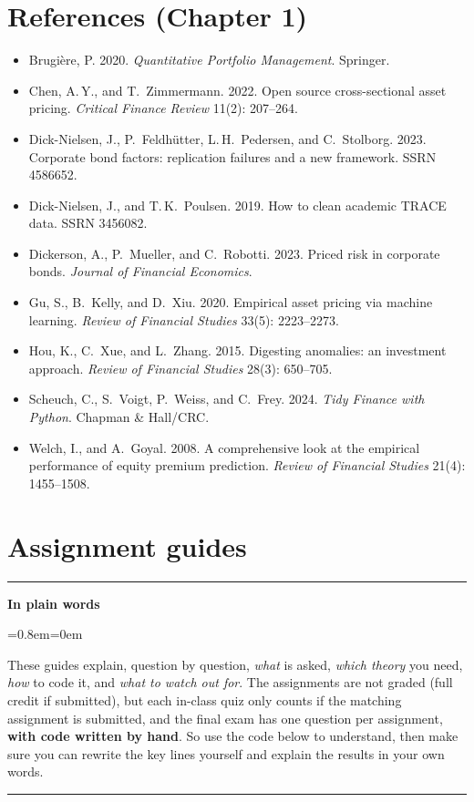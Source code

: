 \documentclass[11pt,a4paper]{report}
\newenvironment{notebox}[1]
  {\par\medskip\Needspace{6\baselineskip}\noindent\rule{\linewidth}{0.4pt}\par\nopagebreak
   \noindent\textbf{#1}\par\nopagebreak
   \begin{list}{}{\leftmargin=0.8em\rightmargin=0em\topsep=2pt}\item[]}
  {\end{list}\nopagebreak\noindent\rule{\linewidth}{0.4pt}\par\medskip}
\newenvironment{plainbox}{\begin{notebox}{In plain words}}{\end{notebox}}
\begin{document}


\chapter*{References (Chapter 1)}
\begin{itemize}[leftmargin=*]
\item Brugi\`ere, P. 2020. \emph{Quantitative Portfolio Management}. Springer.
\item Chen, A.\,Y., and T.~Zimmermann. 2022. Open source cross-sectional asset pricing. \emph{Critical Finance Review} 11(2): 207--264.
\item Dick-Nielsen, J., P.~Feldh\"utter, L.\,H.~Pedersen, and C.~Stolborg. 2023. Corporate bond factors: replication failures and a new framework. SSRN 4586652.
\item Dick-Nielsen, J., and T.\,K.~Poulsen. 2019. How to clean academic TRACE data. SSRN 3456082.
\item Dickerson, A., P.~Mueller, and C.~Robotti. 2023. Priced risk in corporate bonds. \emph{Journal of Financial Economics}.
\item Gu, S., B.~Kelly, and D.~Xiu. 2020. Empirical asset pricing via machine learning. \emph{Review of Financial Studies} 33(5): 2223--2273.
\item Hou, K., C.~Xue, and L.~Zhang. 2015. Digesting anomalies: an investment approach. \emph{Review of Financial Studies} 28(3): 650--705.
\item Scheuch, C., S.~Voigt, P.~Weiss, and C.~Frey. 2024. \emph{Tidy Finance with Python}. Chapman \& Hall/CRC.
\item Welch, I., and A.~Goyal. 2008. A comprehensive look at the empirical performance of equity premium prediction. \emph{Review of Financial Studies} 21(4): 1455--1508.
\end{itemize}

\appendix
\chapter{Assignment guides}
\label{ch:assign}

\begin{plainbox}
These guides explain, question by question, \emph{what} is asked, \emph{which
theory} you need, \emph{how} to code it, and \emph{what to watch out for}. The
assignments are not graded (full credit if submitted), but each in-class quiz
only counts if the matching assignment is submitted, and the final exam has one
question per assignment, \textbf{with code written by hand}. So use the code
below to understand, then make sure you can rewrite the key lines yourself and
explain the results in your own words.
\end{plainbox}
\end{document}
